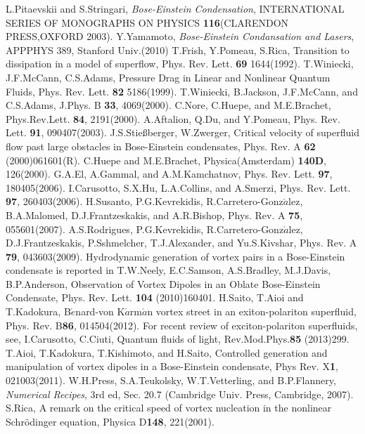 \documentclass[12pt,a4paper]{jbook}
\begin{document}
\begin{thebibliography}{81}
 L.Pitaevskii and S.Stringari, {\it Bose-Einstein Condensation}, INTERNATIONAL SERIES OF MONOGRAPHS ON PHYSICS {\bf 116}(CLARENDON PRESS,OXFORD 2003).
 Y.Yamamoto, {\it Bose-Einstein Condansation and Lasers}, APPPHYS 389, Stanford Univ.(2010)
 T.Frish, Y.Pomeau, S.Rica, Transition to dissipation in a model of superflow, Phys. Rev. Lett. {\bf 69} 1644(1992).
 T.Winiecki, J.F.McCann, C.S.Adams, Pressure Drag in Linear and Nonlinear Quantum Fluids, Phys. Rev. Lett. {\bf 82} 5186(1999).
 T.Winiecki, B.Jackson, J.F.McCann, and C.S.Adams, J.Phys. B {\bf 33}, 4069(2000).
 C.Nore, C.Huepe, and M.E.Brachet, Phys.Rev.Lett. {\bf 84}, 2191(2000).
 A.Aftalion, Q.Du, and Y.Pomeau, Phys. Rev. Lett. {\bf 91}, 090407(2003).
 J.S.Stie\ss berger, W.Zwerger, Critical velocity of superfluid flow past large obstacles in Bose-Einstein condensates, Phys. Rev. A {\bf 62} (2000)061601(R).
 C.Huepe and M.E.Brachet, Physica(Amsterdam) {\bf 140D}, 126(2000).
 G.A.El, A.Gammal, and A.M.Kamchatnov, Phys. Rev. Lett. {\bf 97}, 180405(2006).
 I.Carusotto, S.X.Hu, L.A.Collins, and A.Smerzi, Phys. Rev. Lett. {\bf 97}, 260403(2006).
 H.Susanto, P.G.Kevrekidis, R.Carretero-Gonz$\acute{a}$lez, B.A.Malomed, D.J.Frantzeskakis, and A.R.Bishop, Phys. Rev. A {\bf 75}, 055601(2007).
 A.S.Rodrigues, P.G.Kevrekidis, R.Carretero-Gonz$\acute{a}$lez, D.J.Frantzeskakis, P.Sshmelcher, T.J.Alexander, and Yu.S.Kivshar, Phys. Rev. A {\bf 79}, 043603(2009).
 Hydrodynamic generation of vortex pairs in a Bose-Einstein condensate is reported in T.W.Neely, E.C.Samson, A.S.Bradley, M.J.Davis, B.P.Anderson, Observation of Vortex Dipoles in an Oblate Bose-Einstein Condensate, Phys. Rev. Lett. {\bf 104} (2010)160401.
 H.Saito, T.Aioi and T.Kadokura, B$\acute{e}$nard-von K$\acute{a}$rm$\acute{a}$n vortex street in an exiton-polariton superfluid, Phys. Rev. B{\bf 86}, 014504(2012).
 For recent review of exciton-polariton superfluids, see, I.Carusotto, C.Ciuti, Quantum fluids of light, Rev.Mod.Phys.{\bf 85} (2013)299.
 T.Aioi, T.Kadokura, T.Kishimoto, and H.Saito, Controlled generation and manipulation of vortex dipoles in a Bose-Einstein condensate, Phys Rev. X{\bf 1}, 021003(2011).
 W.H.Press, S.A.Teukolsky, W.T.Vetterling, and B.P.Flannery, {\it Numerical Recipes}, 3rd ed, Sec. 20.7 (Cambridge Univ. Press, Cambridge, 2007).
 S.Rica, A remark on the critical speed of vortex nucleation in the nonlinear Schr\"{o}dinger equation, Physica D{\bf 148}, 221(2001).

\end{thebibliography}
\end{document}
